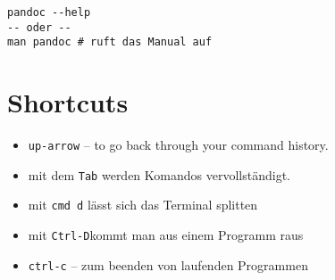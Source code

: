 \documentclass[]{article}
\begin{document}
\begin{verbatim}
pandoc --help
-- oder -- 
man pandoc # ruft das Manual auf
\end{verbatim}

\section{Shortcuts}\label{shortcuts}

\begin{itemize}
\itemsep1pt\parskip0pt
\item
  \texttt{up-arrow} -- to go back through your command history.
\item
  mit dem \texttt{Tab} werden Komandos vervollständigt.
\item
  mit \texttt{cmd d} lässt sich das Terminal splitten
\item
  mit \texttt{Ctrl-D}kommt man aus einem Programm raus
\item
  \texttt{ctrl-c} -- zum beenden von laufenden Programmen
\end{itemize}
\end{document}
